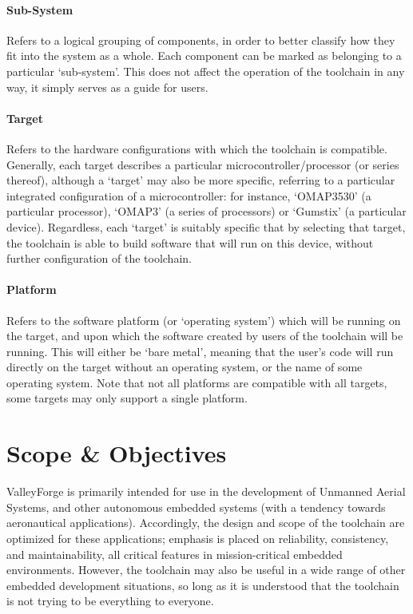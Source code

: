 \documentclass[a4paper, oneside, 11pt, titlepage, onecolumn, openright]{report}
\begin{document}
				\paragraph{Sub-System}  Refers to a logical grouping of components, in order to better classify how they fit into the system as a whole.  Each component can be marked as belonging to a particular `sub-system'.  This does not affect the operation of the toolchain in any way, it simply serves as a guide for users.
				
				\paragraph{Target}  Refers to the hardware configurations with which the toolchain is compatible.  Generally, each target describes a particular microcontroller/processor (or series thereof), although a `target' may also be more specific, referring to a particular integrated configuration of a microcontroller: for instance, `OMAP3530' (a particular processor), `OMAP3' (a series of processors) or `Gumstix' (a particular device).  Regardless, each `target' is suitably specific that by selecting that target, the toolchain is able to build software that will run on this device, without further configuration of the toolchain.
				
				\paragraph{Platform}  Refers to the software platform (or `operating system') which will be running on the target, and upon which the software created by users of the toolchain will be running.  This will either be `bare metal', meaning that the user's code will run directly on the target without an operating system, or the name of some operating system.  Note that not all platforms are compatible with all targets, some targets may only support a single platform.
				
			\section{Scope \& Objectives}
				\label{s:Introduction:Scope & Objectives}
				
				ValleyForge is primarily intended for use in the development of Unmanned Aerial Systems, and other autonomous embedded systems (with a tendency towards aeronautical applications).  Accordingly, the design and scope of the toolchain are optimized for these applications; emphasis is placed on reliability, consistency, and maintainability, all critical features in mission-critical embedded environments.  However, the toolchain may also be useful in a wide range of other embedded development situations, so long as it is understood that the toolchain is not trying to be everything to everyone.
				
\end{document}
